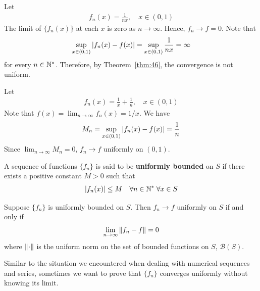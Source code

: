 \documentclass[thmcnt=section, 12pt]{my-elegantbook}
\begin{document}
\begin{example}
    Let
    \begin{align*}
        f_n(x) = \frac{1}{nx},
        \quad x \in (0, 1)
    \end{align*}
    The limit of $\{f_n(x)\}$ at each $x$ is zero as $n \to \infty$. Hence, $f_n \to f = 0$. Note that 
    \begin{align*}
        \sup_{x \in (0, 1)} \left\lvert f_n(x) - f(x) \right\rvert
        = \sup_{x \in (0, 1)} \frac{1}{nx}
        = \infty
    \end{align*}
    for every $n \in \mathbb{N}^\ast$. Therefore, by Theorem~\ref{thm:46}, the convergence is not uniform.
\end{example}

\begin{example}
    Let 
    \begin{align*}
        f_n(x) = \frac{1}{x} + \frac{1}{n},
        \quad x \in (0, 1)
    \end{align*}
    Note that $f(x) = \lim_{n \to \infty} f_n(x) = 1 / x$. We have
    \begin{align*}
        M_n = \sup_{x \in (0, 1)} \left\lvert f_n(x) - f(x) \right\rvert
        = \frac{1}{n}
    \end{align*}
    Since $\lim_{n \to \infty} M_n = 0$, $f_n \to f$ uniformly on $(0, 1)$.
\end{example}


A sequence of functions $\{f_n\}$ is said to be \textbf{uniformly bounded} on $S$ if there exists a positive constant $M > 0$ such that 
\begin{align*}
    \left\lvert f_n(x) \right\rvert \leq M
    \quad \forall n \in \mathbb{N}^\ast \; 
    \forall x \in S
\end{align*}


\begin{theorem}
    Suppose $\{f_n\}$ is uniformly bounded on $S$. Then $f_n \to f$ uniformly on $S$ if and only if
    \begin{align*}
        \lim_{n \to \infty} \left\lVert f_n - f \right\rVert = 0
    \end{align*}
    where $\left\lVert \cdot \right\rVert$ is the uniform norm on the set of bounded functions on $S$, $\mathcal{B}(S)$.
\end{theorem}



Similar to the situation we encountered when dealing with numerical sequences and series, sometimes we want to prove that $\{f_n\}$ converges uniformly without knowing its limit. 
\end{document}
